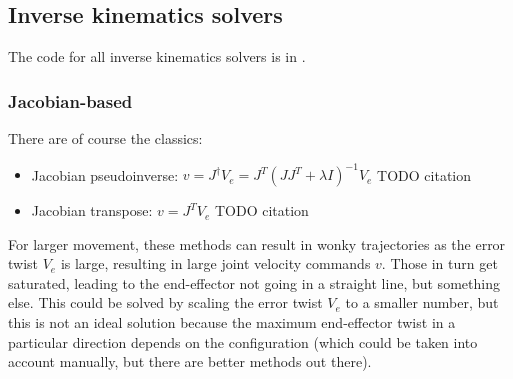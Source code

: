 \subsection{Inverse kinematics solvers}
\label{sub-ik-solvers}
The code for all inverse kinematics solvers
is in 
\newline
{}.

\subsubsection{Jacobian-based}
There are of course the classics:
\begin{itemize}
	\item Jacobian pseudoinverse: 
			$ v = J^{ \dagger } V_{ e }= J^{ T }(JJ^{ T }
			+ \lambda I)^{ -1 } 
			V_{ e }$ TODO citation
	\item Jacobian transpose: $ v = J^{ T } V_{ e }  $ TODO citation
\end{itemize}

For larger movement, these methods can result in wonky 
trajectories as the error twist $ V_{ e }  $ is large,
resulting in large joint velocity commands $ v  $.
Those in turn get saturated, leading to the end-effector
not going in a straight line, but something else.
This could be solved by scaling the error twist
$ V_{ e }  $ to a smaller number, but this is 
not an ideal solution because the maximum end-effector 
twist in a particular direction depends on the configuration
(which could be taken into account manually, but there are 
better methods out there).


%
%

